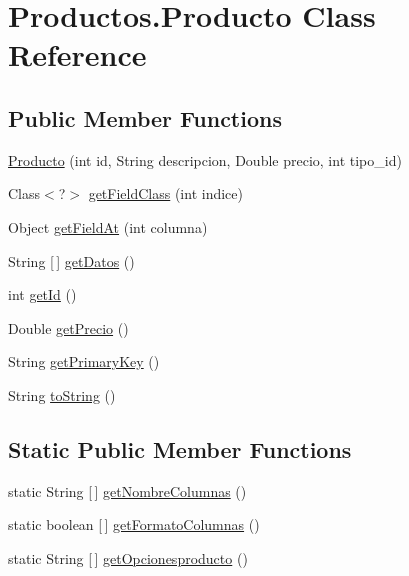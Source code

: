 \hypertarget{class_productos_1_1_producto}{}\section{Productos.\+Producto Class Reference}
\label{class_productos_1_1_producto}
\subsection*{Public Member Functions}
\begin{DoxyCompactItemize}
\item 
\mbox{\hyperlink{class_productos_1_1_producto_a12b199503d98bad58487a9948fea8517}{Producto}} (int id, String descripcion, Double precio, int tipo\+\_\+id)
\item 
Class$<$?$>$ \mbox{\hyperlink{class_productos_1_1_producto_ae853d92d3cf87463dc31c6c9033e4f23}{get\+Field\+Class}} (int indice)
\item 
Object \mbox{\hyperlink{class_productos_1_1_producto_a2a39275df7fbbf26f2173b760d0d4ba9}{get\+Field\+At}} (int columna)
\item 
String \mbox{[}$\,$\mbox{]} \mbox{\hyperlink{class_productos_1_1_producto_ad6c7e3cb9b1c30c06a78a2534cc7343e}{get\+Datos}} ()
\item 
int \mbox{\hyperlink{class_productos_1_1_producto_ad91315ab5e1fe2699a805125e5c50e2c}{get\+Id}} ()
\item 
Double \mbox{\hyperlink{class_productos_1_1_producto_aceed34a26585af33140a3d9232d0cc64}{get\+Precio}} ()
\item 
String \mbox{\hyperlink{class_productos_1_1_producto_a3b9f2b2cfcbbc5708e65dbfeee373528}{get\+Primary\+Key}} ()
\item 
String \mbox{\hyperlink{class_productos_1_1_producto_a0516e55bd0c688748075bb13fd949595}{to\+String}} ()
\end{DoxyCompactItemize}
\subsection*{Static Public Member Functions}
\begin{DoxyCompactItemize}
\item 
static String \mbox{[}$\,$\mbox{]} \mbox{\hyperlink{class_productos_1_1_producto_a2aa076fdb51668e1d75dd216a00ec909}{get\+Nombre\+Columnas}} ()
\item 
static boolean \mbox{[}$\,$\mbox{]} \mbox{\hyperlink{class_productos_1_1_producto_a1a5e9f3b94441b04e3e074f25648c188}{get\+Formato\+Columnas}} ()
\item 
static String \mbox{[}$\,$\mbox{]} \mbox{\hyperlink{class_productos_1_1_producto_ac432aecde9919dbdd6df6002292c3c6d}{get\+Opcionesproducto}} ()
\end{DoxyCompactItemize}


